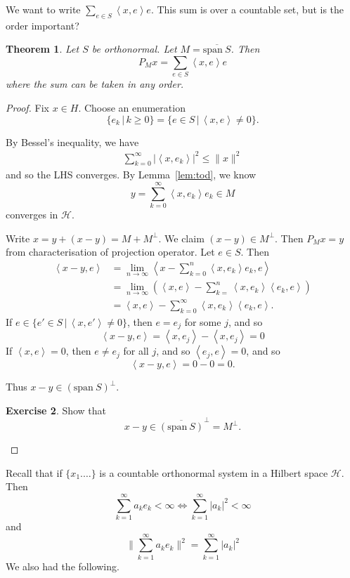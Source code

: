 \documentclass[10pt, oneside, reqno]{amsbook}
\theoremstyle{plain}%
\newtheorem{thm}{Theorem}[section]
\theoremstyle{definition}
\newtheorem{exer}[thm]{Exercise}
\theoremstyle{remark}
\newcommand{\Hil}{\mathcal{H}}
\newcommand{\iprod}[1]{\left\langle #1 \right\rangle}
\newcommand{\spans}{\text{span}\ }
\begin{document}
We want to write $\sum_{e \in S} \iprod{x,e} e$.  This sum is over a countable set, but is the order important?

\begin{thm}
    Let $S$ be orthonormal.  Let $M = \overline{\spans S}$.  Then \[
        P_M x = \sum_{e \in S} \iprod{x,e} e
    \] where the sum can be taken in any order.
\end{thm}
\begin{proof}
    Fix $x \in H$.  Choose an enumeration $$\{ e_k \, | \, k \geq 0 \} = \{ e \in S \, | \, \iprod{x,e} \neq 0 \}.$$
    
    By Bessel's inequality, we have \begin{align*}
        \sum_{k=0}^\infty | \iprod{x, e_k} |^2 \leq \| x \|^2
    \end{align*} and so the LHS converges.  By Lemma~\ref{lem:tod}, we know \[
        y = \sum_{ k = 0}^\infty \iprod{x,e_k} e_k \in M
    \] converges in $\Hil$.  
    
    Write $x = y + (x-y) = M + M^\perp$.  We claim $(x-y) \in M^\perp$.  Then $P_Mx = y$ from characterisation of projection operator.  Let $e \in S$.  Then \begin{align*}
        \iprod{x-y, e} &= \lim_{n \rightarrow \infty} \iprod{ x - \sum_{k=0}^n \iprod{x, e_k} e_k, e} \\    
        &= \lim_{n \rightarrow \infty} ( \iprod{x,e} - \sum_{k=}^n \iprod{x, e_k} \iprod{e_k, e}) \\
        &= \iprod{x,e} - \sum_{k=0}^\infty \iprod{x, e_k} \iprod{e_k, e}.
    \end{align*}
    If $e \in \{ e' \in S \, | \, \iprod{x, e'} \neq 0 \}$, then $e = e_j$ for some $j$, and so \[
        \iprod{x-y, e} = \iprod{x, e_j} - \iprod{x, e_j} = 0
    \]  
    If $\iprod{x,e} = 0$, then $e \neq e_j$ for all $j$, and so $\iprod{e_j, e} = 0$, and so \[
        \iprod{x-y, e} = 0 - 0 = 0.
    \]
    
    Thus $x-y \in (\spans S)^\perp$.
    
    \begin{exer}
        Show that \[
            x-y \in \overline{(\spans S)}^\perp = M^\perp.
        \]
    \end{exer}
\end{proof}

% 
Recall that if $\{ x_1. \dots \}$ is a countable orthonormal system in a Hilbert space $\Hil$.  Then \[
    \sum_{k=1}^\infty a_k e_k < \infty \iff \sum_{k=1}^\infty |a_k|^2 < \infty 
\] and \[
    \| \sum_{k=1}^\infty a_k e_k \|^2 = \sum_{k=1}^\infty |a_k|^2 \tag{$\star$}
\] We also had the following.
\end{document}
